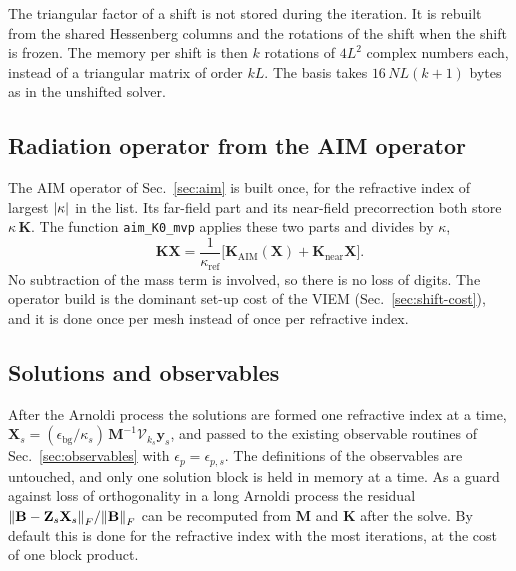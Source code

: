 \documentclass[11pt,a4paper]{article}
\begin{document}
The triangular factor of a shift is not stored during the iteration.
It is rebuilt from the shared Hessenberg columns and the rotations of
the shift when the shift is frozen.
The memory per shift is then $k$ rotations of $4L^{2}$ complex numbers
each, instead of a triangular matrix of order $kL$.
The basis takes $16\,N L (k+1)$ bytes as in the unshifted solver.

\subsection{Radiation operator from the AIM operator}
\label{sec:shift-k0}

The AIM operator of Sec.~\ref{sec:aim} is built once, for the
refractive index of largest $\abs{\kappa}$ in the list.
Its far-field part and its near-field precorrection both store
$\kappa\,\mathbf{K}$.
The function \texttt{aim\_K0\_mvp} applies these two parts and divides
by $\kappa$,
\begin{equation}
  \mathbf{K}\mathbf{X}
    = \frac{1}{\kappa_{\text{ref}}}
      \bigl[\mathbf{K}_{\text{AIM}}(\mathbf{X})
            + \mathbf{K}_{\text{near}}\mathbf{X}\bigr].
  \label{eq:shift-k0}
\end{equation}
No subtraction of the mass term is involved, so there is no loss of
digits.
The operator build is the dominant set-up cost of the VIEM
(Sec.~\ref{sec:shift-cost}), and it is done once per mesh instead of
once per refractive index.

\subsection{Solutions and observables}
\label{sec:shift-observables}

After the Arnoldi process the solutions are formed one refractive index
at a time,
$\mathbf{X}_s = (\epsilon_{\text{bg}}/\kappa_s)\,
 \mathbf{M}^{-1}\mathcal{V}_{k_s}\mathbf{y}_s$,
and passed to the existing observable routines of
Sec.~\ref{sec:observables} with $\epsilon_p = \epsilon_{p,s}$.
The definitions of the observables are untouched, and only one
solution block is held in memory at a time.
As a guard against loss of orthogonality in a long Arnoldi process the
residual $\norm{\mathbf{B} - \mathbf{Z}_s\mathbf{X}_s}_F /
\norm{\mathbf{B}}_F$ can be recomputed from $\mathbf{M}$ and
$\mathbf{K}$ after the solve.
By default this is done for the refractive index with the most
iterations, at the cost of one block product.
\end{document}
